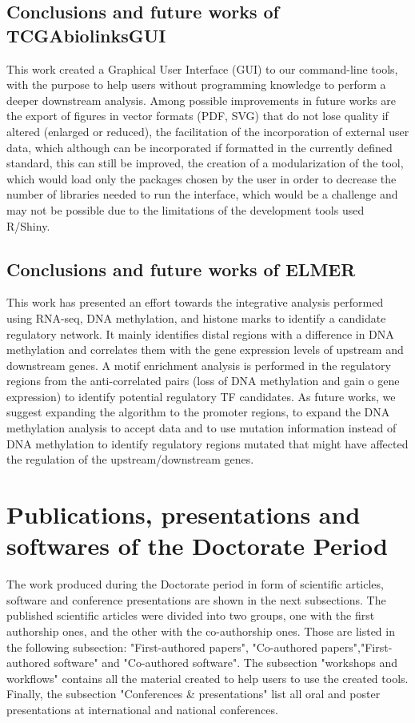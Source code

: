 \subsection{Conclusions and future works of TCGAbiolinksGUI}

This work created a Graphical User Interface (GUI) to our command-line tools,
with the purpose to help users without programming knowledge to perform a
deeper downstream analysis. Among possible improvements in future works are
the export of figures in vector formats (PDF, SVG) that do not lose quality
if altered (enlarged or reduced), the facilitation of the incorporation of external
user data, which although can be incorporated if formatted in the currently defined standard,
this can still be improved, the creation of a modularization of the tool,
which would load only the packages chosen by the user in order to decrease the
 number of libraries needed to run the interface, which
would be a challenge and may not be possible due to the limitations of the development tools used R/Shiny.

\subsection{Conclusions and future works of ELMER}

This work has presented an effort towards the integrative analysis performed
using RNA-seq, DNA methylation, and histone marks to identify a candidate regulatory network.
It mainly identifies distal regions with a difference in DNA methylation and correlates them
with the gene expression levels of upstream and downstream genes.
A motif enrichment analysis is performed in the regulatory regions from the anti-correlated
pairs (loss of DNA methylation and gain o gene expression) to identify potential
regulatory TF candidates. As future works, we suggest expanding the algorithm to
the promoter regions, to expand the DNA methylation analysis to accept
 data
 and to use mutation information instead of DNA methylation
to identify regulatory regions mutated that might have affected the
regulation of the upstream/downstream genes.


\section{Publications, presentations and softwares of the Doctorate Period}

The work produced during the Doctorate period in form of scientific articles,
software and conference presentations are shown in the next subsections.
The published scientific articles were divided into two groups, one with the first authorship ones, and the other with the co-authorship ones. Those are listed in the following subsection: "First-authored papers", "Co-authored papers","First-authored software" and "Co-authored software".
The subsection "workshops and workflows" contains all the material created to help users to use the created tools. Finally, the subsection "Conferences \& presentations" list all oral and poster presentations at international and national conferences.

